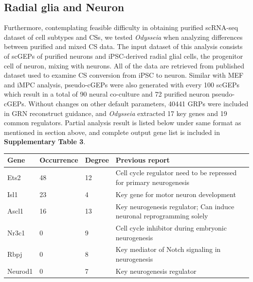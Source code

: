 \documentclass[fleqn,10pt]{wlscirep}
\begin{document}
\subsection*{Radial glia and Neuron}
Furthermore, contemplating feasible difficulty in obtaining purified scRNA-seq dataset of cell subtypes and CSs, we tested \emph{Odysseia} when analyzing differences between purified and mixed CS data.
The input dataset of this analysis consists of scGEPs of purified neurons and iPSC-derived radial glial cells, the progenitor cell of neuron, mixing with neurons.
All of the data are retrieved from published dataset used to examine CS conversion from iPSC to neuron.\cite{ips_neuron_ascl1}
Similar with MEF and iMPC analysis, pseudo-cGEPs were also generated with every 100 scGEPs which result in a total of 90 neural co-culture and 72 purified neuron pseudo-cGEPs.
Without changes on other default parameters, 40441 GRPs were included in GRN reconstruct guidance, and \emph{Odysseia} extracted 17 key genes and 19 common regulators.
Partial analysis result is listed below under same format as mentioned in section above, and complete output gene list is included in \textbf{Supplementary Table 3}.

\begin{table}[ht]
\centering
\begin{tabular}{|l|l|l|l|}
\hline
\textbf{Gene} & \textbf{Occurrence} & \textbf{Degree} & \textbf{Previous report}  \\
\hline
Ets2 & 48 & 12 & Cell cycle regulator need to be repressed for primary neurogenesis\cite{ets2_1, ets2_2} \\
\hline
Isl1 & 23 & 4 & Key gene for motor neuron development\cite{isl1_1, isl1_2011, isl1_repro}\\
\hline
Ascl1 & 16 & 13 & Key neurogenesis regulator\cite{ips_neuron_ascl1, ascl1_1}; Can induce neuronal reprogramming solely\cite{ascl1_1frepro ,ascl1_repro} \\
\hline
Nr3c1 & 0 & 9 & Cell cycle inhibitor during embryonic neurogenesis\cite{nr3c1}\\
\hline
Rbpj & 0 & 8 & Key mediator of Notch signaling in neurogenesis\cite{rbpj_1, rbpj_2, rbpj_3}\\
\hline
Neurod1 & 0 & 7 & Key neurogenesis regulator\cite{ips_neuron_ascl1, neurod1_1, neurod1_2, neurod1_3, neurod1_4} \\
\hline
\end{tabular}
\end{table}
\end{document}
